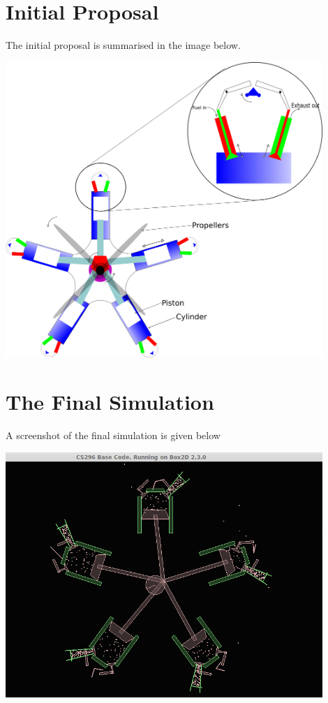 \documentclass[11pt]{article}
\begin{document}
\pagebreak

\section{Initial Proposal}
The initial proposal is summarised in the image below.
\begin{center}
	\includegraphics[width=12cm]{./images/initialProposal.png}
\end{center}
\pagebreak
\section{The Final Simulation}
A screenshot of the final simulation is given below
\begin{center}
	\includegraphics[width=12cm]{./images/fullReport.png}
\end{center}
\end{document}
